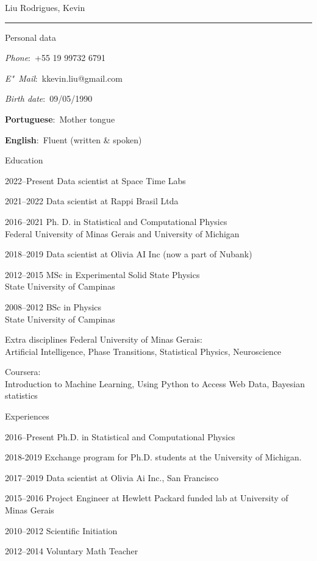 \documentclass[12pt,a4paper]{article}
\begin{document}
\begin{cv}{Liu Rodrigues, Kevin}
\noindent\rule{\linewidth}{0.4pt}
    \begin{cvlist}{Personal data}
        \item \textit{Phone}:~+55 19 99732 6791
        \item \textit{E"~Mail}:~kkevin.liu@gmail.com
        \item \textit{Birth date}:~09/05/1990
  
        \item \textbf{Portuguese}:~Mother tongue
        \item \textbf{English}:~Fluent (written \& spoken)
    \end{cvlist}
  
  \begin{cvlist}{Education}
    \item[2022--Present] Data scientist at Space Time Labs
    \item[2021--2022] Data scientist at Rappi Brasil Ltda
    \item[2016--2021] Ph. D. in Statistical and Computational Physics\\
        Federal University of Minas Gerais and University of Michigan
    \item[2018--2019] Data scientist at Olivia AI Inc (now a part of Nubank)\\
    \item[2012--2015] MSc in Experimental Solid State Physics\\
        State University of Campinas\\
    \item[2008--2012] BSc in Physics\\
        State University of Campinas
    \item[Extra disciplines] Federal University of Minas Gerais:\\
        Artificial Intelligence, Phase Transitions, Statistical Physics, Neuroscience
    \item[] Coursera:\\
        Introduction to Machine Learning, Using Python to Access Web Data, Bayesian statistics
  \end{cvlist}

  \begin{cvlist}{Experiences}
  \item[2016--Present] Ph.D. in Statistical and Computational Physics
  \item[2018-2019] Exchange program for Ph.D. students at the University of Michigan.
  \item[2017--2019] Data scientist at Olivia Ai Inc., San Francisco
  \item[2015--2016] Project Engineer at Hewlett Packard funded lab at University of Minas Gerais
  \item[2010--2012] Scientific Initiation
  \item[2012--2014] Voluntary Math Teacher
  \end{cvlist}


\end{cv}
\end{document}
